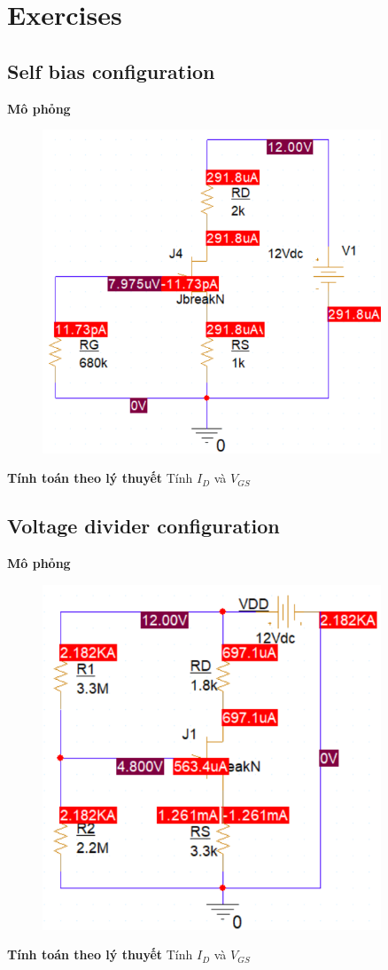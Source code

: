 \section{Exercises}
\subsection{Self bias configuration}
\textbf{Mô phỏng}
\begin{figure}[!htbp]
    \centering
    \includegraphics[width=0.9\textwidth]{graphics/ex1/f1.PNG}
\end{figure}

\textbf{Tính toán theo lý thuyết}
Tính $I_D$ và $V_{GS}$

\subsection{Voltage divider configuration}
\textbf{Mô phỏng}
\begin{figure}[!htbp]
    \centering
    \includegraphics[width=0.9\textwidth]{graphics/ex1/f2.PNG}
\end{figure}

\textbf{Tính toán theo lý thuyết}
Tính $I_D$ và $V_{GS}$